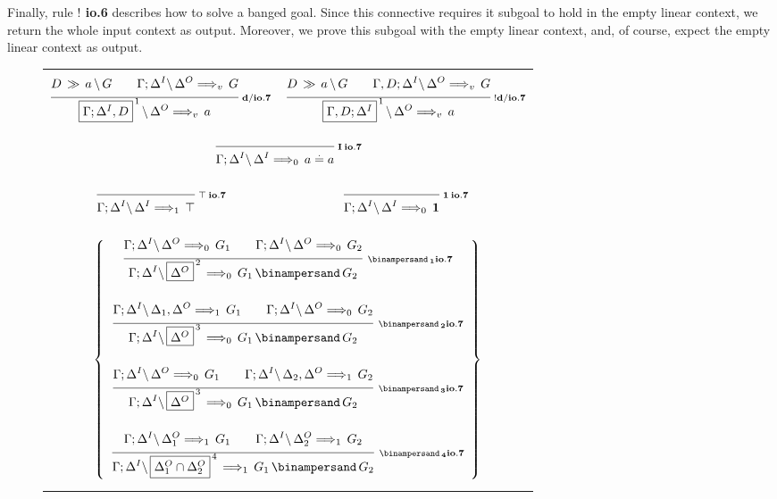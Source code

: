 Finally, rule {\bf $!$ io.6} describes how to solve a banged goal. Since this
connective requires it subgoal to hold in the empty linear context, we return
the whole input context as output. Moreover, we prove this subgoal with the
empty linear context, and, of course, expect the empty linear context as
output.


\clearpage
\begin{figure}[t]
  \begin{center}
    \leavevmode

    \begin{tabular}{|cc|}
      \hline &\\
      $\ruleII
        {\decd{D}{a}{G}}
        {\ioVII{\G;\D^I}{\D^O}{G}{v}}
        {\ioVII{\fb{\G;\D^I,D}{1}}{\D^O}{a}{v}}
        {d/io.7}$
      &
      $\ruleII
        {\decd{D}{a}{G}}
        {\ioVII{\G,D;\D^I}{\D^O}{G}{v}}
        {\ioVII{\fb{\G,D;\D^I}{1}}{\D^O}{a}{v}}
        {!d/io.7}$
      \\&\\
      \multicolumn{2}{|c|}{
        $\ruleI
          {}
          {\ioVII{\G;\D^I}{\D^I}{\eq{a}{a}}{0}}
          {I \: io.7}$}
      \\&\\

      $\ruleI
        {}
        {\ioVII{\G;\D^I}{\D^I}{\Top}{1}}
        {\Top \: io.7}$
      &
      $\ruleI
        {}
        {\ioVII{\G;\D^I}{\D^I}{\One}{0}}
        {\One \: io.7}$
      \\&\\&\\
      \multicolumn{2}{|c|}{
        $\left\{
          \begin{array}{c}
            \ruleII
              {\ioVII{\G;\D^I}{\D^O}{G_1}{0}}
              {\ioVII{\G;\D^I}{\D^O}{G_2}{0}}
              {\ioVII{\G;\D^I}{\fb{\D^O}{2}}{G_1 \With G_2}{0}}
              {\With_1 io.7}
          \\ \\
            \ruleII
              {\ioVII{\G;\D^I}{\D_1,\D^O}{G_1}{1}}
              {\ioVII{\G;\D^I}{\D^O}{G_2}{0}}
              {\ioVII{\G;\D^I}{\fb{\D^O}{3}}{G_1 \With G_2}{0}}
              {\With_2 io.7}
          \\ \\
            \ruleII
              {\ioVII{\G;\D^I}{\D^O}{G_1}{0}}
              {\ioVII{\G;\D^I}{\D_2,\D^O}{G_2}{1}}
              {\ioVII{\G;\D^I}{\fb{\D^O}{3}}{G_1 \With G_2}{0}}
              {\With_3 io.7}
          \\ \\
            \ruleII
              {\ioVII{\G;\D^I}{\D^O_1}{G_1}{1}}
              {\ioVII{\G;\D^I}{\D^O_2}{G_2}{1}}
              {\ioVII{\G;\D^I}{\fb{\D^O_1 \cap \D^O_2}{4}}{G_1 \With G_2}{1}}
              {\With_4 io.7}
          \end{array}
        \right\}$}
      \\&\\
      \hline
    \end{tabular}


\end{center}
\end{figure}
